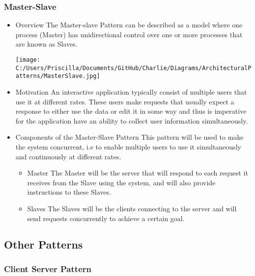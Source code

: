 \documentclass[a4paper,12pt]{article}
\begin{document}
\subsubsection{Master-Slave}
\begin{itemize}
\item{Overview}
\newline
The Master-slave Pattern can be described as  a model where one process (Master) has unidirectional control over one or more processes that are known as Slaves. 
\newline
\begin{minipage}{\linewidth} 
\centering
\texttt{[image: C:/Users/Priscilla/Documents/GitHub/Charlie/Diagrams/ArchitecturalPatterns/MasterSlave.jpg]}
\end{minipage}
\item{Motivation}
\newline
An interactive application typically consist of multiple users that use it at different rates. These users make requests that usually expect a response to either use the data or edit it in some way and thus is imperative for the application have an ability to collect user information simultaneously.

\item{Components of the Master-Slave Pattern}
\newline
This pattern will be used to make the system concurrent, i.e to enable multiple users to use it simultaneously and continuously at different rates.
\begin{itemize}
\item{Master} 
\newline
The Master will be the server that will respond to each request it receives from the Slave using the system, and will also provide instructions to these Slaves.
\item{Slaves}
\newline 
The Slaves will be the clients connecting to the server and will  send requests concurrently to achieve a certain goal.
\end{itemize}
\end{itemize}

\subsection{Other Patterns}
\subsubsection{Client Server Pattern}
\end{document}
